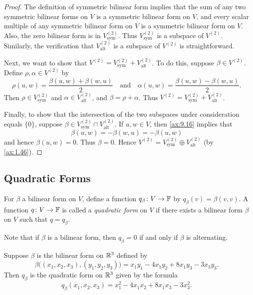 \begin{proof}
The definition of symmetric bilinear form implies that the sum of any two
symmetric bilinear forms on $V$ is a symmetric bilinear form on $V$, and every
scalar multiple of any symmetric bilinear form on $V$ is a symmetric bilinear
form on $V$. Also, the zero bilinear form is in $V_{\mathrm{sym}}^{(2)}$. Thus
$V_{\mathrm{sym}}^{(2)}$ is a subspace of $V^{(2)}$. Similarly, the
verification that $V_{\mathrm{alt}}^{(2)}$ is a subspace of $V^{(2)}$ is
straightforward.

Next, we want to show that
$V^{(2)}=V_{\mathrm{sym}}^{(2)}+V_{\mathrm{alt}}^{(2)}$. To do this, suppose
$\beta\in V^{(2)}$. Define $\rho,\alpha\in V^{(2)}$ by
\[ \rho(u,w) = \frac{\beta(u,w)+\beta(w,u)}{2} \quad\text{and}\quad
   \alpha(u,w) = \frac{\beta(u,w)-\beta(w,u)}{2}. \]
Then $\rho\in V_{\mathrm{sym}}^{(2)}$ and $\alpha\in V_{\mathrm{alt}}^{(2)}$,
and $\beta=\rho+\alpha$. Thus
$V^{(2)}=V_{\mathrm{sym}}^{(2)}+V_{\mathrm{alt}}^{(2)}$.

Finally, to show that the intersection of the two subspaces under
consideration equals $\{0\}$, suppose
$\beta\in V_{\mathrm{sym}}^{(2)}\cap V_{\mathrm{alt}}^{(2)}$. If $u,w\in V$,
then \ref{ax:9.16} implies that
\[ \beta(u,w) = -\beta(w,u) = -\beta(u,w) \]
and hence $\beta(u,w)=0$. Thus $\beta=0$. Hence
$V^{(2)}=V_{\mathrm{sym}}^{(2)}\oplus V_{\mathrm{alt}}^{(2)}$ (by
\ref{ax:1.46}).
\end{proof}

\subsection{Quadratic Forms}

\begin{definition}\label{ax:9.18}
For $\beta$ a bilinear form on $V$, define a function $q_\beta\colon V\to\mathbb{F}$
by $q_\beta(v)=\beta(v,v)$. A function $q\colon V\to\mathbb{F}$ is called a
\emph{quadratic form} on $V$ if there exists a bilinear form $\beta$ on $V$
such that $q=q_\beta$.
\end{definition}

Note that if $\beta$ is a bilinear form, then $q_\beta=0$ if and only if
$\beta$ is alternating.

\begin{example}\label{ax:9.19}
Suppose $\beta$ is the bilinear form on $\mathbb{R}^3$ defined by
\[ \beta\bigl((x_1,x_2,x_3),(y_1,y_2,y_3)\bigr)
   = x_1y_1-4x_1y_2+8x_1y_3-3x_3y_3. \]
Then $q_\beta$ is the quadratic form on $\mathbb{R}^3$ given by the formula
\[ q_\beta(x_1,x_2,x_3) = x_1^2-4x_1x_2+8x_1x_3-3x_3^2. \]
\end{example}

